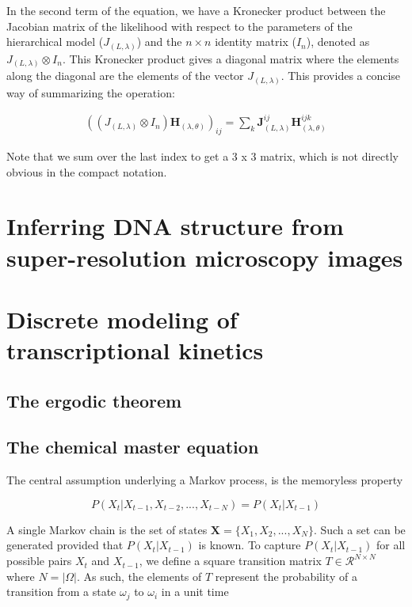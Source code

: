 \documentclass{ucetd}
\begin{document}
In the second term of the equation, we have a Kronecker product between the Jacobian matrix of the likelihood with respect to the parameters of the hierarchical model ($J_{(L,\lambda)}$) and the $n\times n$ identity matrix ($I_n$), denoted as $J_{(L,\lambda)}\otimes I_n$. This Kronecker product gives a diagonal matrix where the elements along the diagonal are the elements of the vector $J_{(L,\lambda)}$. This provides a concise way of summarizing the operation:

\begin{align*}
((J_{(L,\lambda)}\otimes I_{n})\mathbf{H}_{(\lambda,\theta)})_{ij} = \sum_{k}\mathbf{J}_{(L,\lambda)}^{ij}\mathbf{H}_{(\lambda,\theta)}^{ijk}
\end{align*}

Note that we sum over the last index to get a 3 x 3 matrix, which is not directly obvious in the compact notation.


\chapter{Inferring DNA structure from super-resolution microscopy images}

\chapter{Discrete modeling of transcriptional kinetics}

\section{The ergodic theorem}

\section{The chemical master equation}

The central assumption underlying a Markov process, is the memoryless property

\begin{equation*}
P(X_{t}|X_{t-1}, X_{t-2}, ..., X_{t-N}) = P(X_{t}|X_{t-1})
\end{equation*}

A single Markov chain is the set of states $\bm{X} = \{X_{1},X_{2},...,X_{N}\}$. Such a set can be generated provided that $P(X_{t}|X_{t-1})$ is known. To capture $P(X_{t}|X_{t-1})$ for all possible pairs $X_{t}$ and $X_{t-1}$, we define a square transition matrix $T\in \mathcal{R}^{N\times N}$ where $N = |\Omega|$. As such, the elements of $T$ represent the probability of a transition from a state $\omega_{j}$ to $\omega_{i}$ in a unit time
\end{document}
